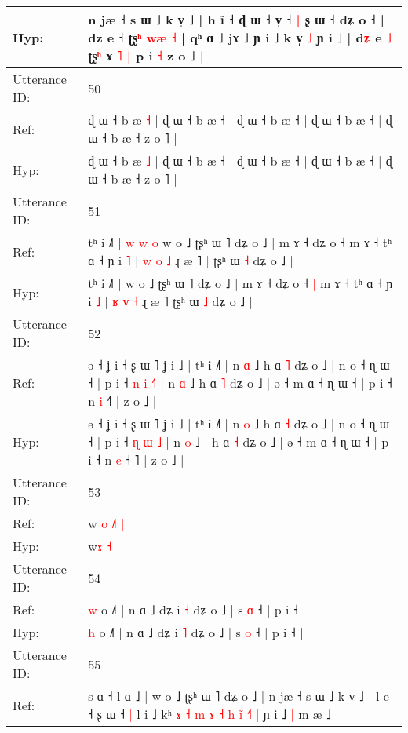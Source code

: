 \documentclass[10pt]{article}
\DeclareRobustCommand{\hl}[1]{{\textcolor{red}{#1}}}
\begin{document}
\begin{longtable}{ll}
 \\
Hyp: & n jæ ˧ s ɯ ˩ k v̩ ˩ | h ĩ ˧\hl{}\hl{} ɖ ɯ ˧ v̩ ˧\hl{ }\hl{|} ʂ ɯ ˧ dʑ o ˧ | dz e ˧ ʈʂ\hl{ʰ} \hl{w}\hl{æ} \hl{˧} | qʰ ɑ ˩ jɤ ˩ ɲ i ˩ k v̩ \hl{˩} ɲ i ˩ | d\hl{ʑ} e \hl{˩} ʈʂ\hl{ʰ} ɤ\hl{ }\hl{˥} \hl{|} p i \hl{˧} z o ˩ |
 \\
\midrule
Utterance ID: & 50 \\
Ref: & ɖ ɯ ˧ b æ \hl{˧} | ɖ ɯ ˧ b æ ˧ | ɖ ɯ ˧ b æ ˧ | ɖ ɯ ˧ b æ ˧ | ɖ ɯ ˧ b æ ˧ z o ˥ |
 \\
Hyp: & ɖ ɯ ˧ b æ \hl{˩} | ɖ ɯ ˧ b æ ˧ | ɖ ɯ ˧ b æ ˧ | ɖ ɯ ˧ b æ ˧ | ɖ ɯ ˧ b æ ˧ z o ˥ |
 \\
\midrule
Utterance ID: & 51 \\
Ref: & tʰ i ˩˥ |\hl{ }\hl{w}\hl{ }\hl{w}\hl{ }\hl{o} w o ˩ ʈʂʰ ɯ ˥ dʑ o ˩ | m ɤ ˧ dʑ o ˧\hl{}\hl{} m ɤ ˧ tʰ ɑ ˧ ɲ i \hl{˥} | \hl{w} \hl{}\hl{o} \hl{˩} ɻ æ ˥\hl{ }\hl{|} ʈʂʰ ɯ \hl{˧} dʑ o ˩ |
 \\
Hyp: & tʰ i ˩˥ |\hl{}\hl{}\hl{}\hl{}\hl{}\hl{} w o ˩ ʈʂʰ ɯ ˥ dʑ o ˩ | m ɤ ˧ dʑ o ˧\hl{ }\hl{|} m ɤ ˧ tʰ ɑ ˧ ɲ i \hl{˩} | \hl{ʁ} \hl{v}\hl{̩} \hl{˧} ɻ æ ˥\hl{}\hl{} ʈʂʰ ɯ \hl{˩} dʑ o ˩ |
 \\
\midrule
Utterance ID: & 52 \\
Ref: & ə ˧ ʝ i ˧ ʂ ɯ ˥ ʝ i ˩ | tʰ i ˩˥ | n \hl{ɑ} ˩ h ɑ \hl{˥} dʑ o ˩ | n o ˧ ɳ ɯ ˧ | p i ˧ \hl{n} \hl{i} \hl{˧}\hl{˥} | n \hl{ɑ} ˩\hl{}\hl{} h ɑ \hl{˥} dʑ o ˩ | ə ˧ m ɑ ˧ ɳ ɯ ˧ | p i ˧ n \hl{i} ˧\hl{}˥ | z o ˩ |
 \\
Hyp: & ə ˧ ʝ i ˧ ʂ ɯ ˥ ʝ i ˩ | tʰ i ˩˥ | n \hl{o} ˩ h ɑ \hl{˧} dʑ o ˩ | n o ˧ ɳ ɯ ˧ | p i ˧ \hl{ɳ} \hl{ɯ} \hl{}\hl{˩} | n \hl{o} ˩\hl{ }\hl{|} h ɑ \hl{˧} dʑ o ˩ | ə ˧ m ɑ ˧ ɳ ɯ ˧ | p i ˧ n \hl{e} ˧\hl{ }˥ | z o ˩ |
 \\
\midrule
Utterance ID: & 53 \\
Ref: & w\hl{ }\hl{o}\hl{ }\hl{˩}\hl{˥} \hl{|}
 \\
Hyp: & w\hl{}\hl{}\hl{}\hl{}\hl{ɤ} \hl{˧}
 \\
\midrule
Utterance ID: & 54 \\
Ref: & \hl{w} o ˩˥ | n ɑ ˩ dʑ i \hl{˧} dʑ o ˩ | s \hl{ɑ} ˧ | p i ˧ |
 \\
Hyp: & \hl{h} o ˩˥ | n ɑ ˩ dʑ i \hl{˥} dʑ o ˩ | s \hl{o} ˧ | p i ˧ |
 \\
\midrule
Utterance ID: & 55 \\
Ref: & s ɑ ˧ l ɑ ˩ | w o ˩ ʈʂʰ ɯ ˥ dʑ o ˩ | n jæ ˧ s ɯ ˩ k v̩ ˩ | l e ˧ ʂ ɯ ˧\hl{ }\hl{|} l i ˩ kʰ \hl{ɤ} \hl{˧} \hl{m} \hl{ɤ} \hl{˧} \hl{h} \hl{i}\hl{̃} \hl{˧}\hl{˥} \hl{|} ɲ i ˩\hl{ }\hl{|} m æ ˩ |
 \\

\end{longtable}
\end{document}
